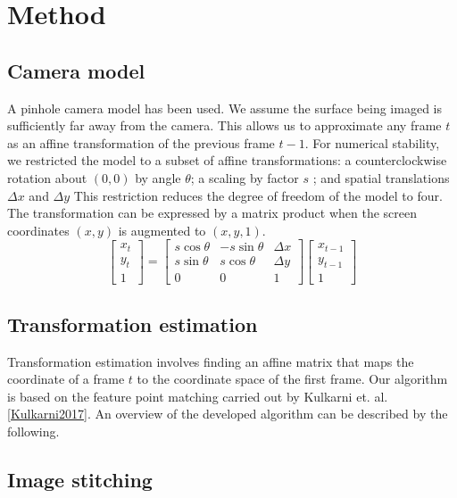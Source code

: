 \section{Method}
\subsection{Camera model}

A pinhole camera model has been used.
We assume the surface being imaged is sufficiently far away from the camera.
This allows us to approximate any frame $t$ as an affine transformation of the previous frame $t-1$.
For numerical stability, we restricted the model to a subset of affine transformations:
a counterclockwise rotation about $(0,0)$ by angle $\theta$;
a scaling by factor $s$ ;
and spatial translations $\Delta x$ and $\Delta y$
This restriction reduces the degree of freedom of the model to four.
The transformation can be expressed by a matrix product when the screen coordinates $(x,y)$ is augmented to $(x,y,1)$.
\begin{equation}
  \begin{bmatrix}
    x_{t}\\
    y_{t}\\
		1
  \end{bmatrix}
  =
  \begin{bmatrix}
		s\cos\theta & -s\sin\theta & \Delta x \\
    s\sin\theta &  s\cos\theta & \Delta y \\
    0           &  0           & 1
  \end{bmatrix}
  \begin{bmatrix}
		x_{t-1} \\
		y_{t-1} \\
		1
  \end{bmatrix}
\end{equation}

\subsection{Transformation estimation}

Transformation estimation involves finding an affine matrix that maps the coordinate of a frame $t$ to the coordinate space of the first frame.
Our algorithm is based on the feature point matching carried out by Kulkarni et. al. \ref{Kulkarni2017}.
An overview of the developed algorithm can be described by the following.
\begin{algorithmic}
	\ENDFOR
	\ENDFOR
\end{algorithmic}

\subsection{Image stitching}
